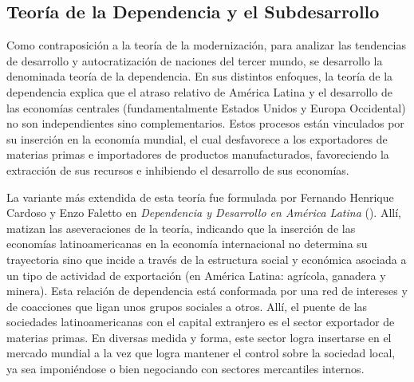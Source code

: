 \documentclass{article}
\begin{document}
\subsection{Teoría de la Dependencia y el Subdesarrollo}

Como contraposición a la teoría de la modernización, para analizar las tendencias de
desarrollo y autocratización de naciones del tercer mundo, se desarrollo la denominada
teoría de la dependencia. En sus distintos enfoques, la teoría de la dependencia explica
que el atraso relativo de América Latina y el desarrollo de las economías centrales
(fundamentalmente Estados Unidos y Europa Occidental) no son independientes sino 
complementarios. Estos procesos están vinculados por su inserción en la economía mundial,
el cual desfavorece a los exportadores de materias primas e importadores de productos
manufacturados, favoreciendo la extracción de sus recursos e inhibiendo el desarrollo
de sus economías.

La variante más extendida de esta teoría fue formulada por Fernando Henrique Cardoso
y Enzo Faletto en \textit{Dependencia y Desarrollo en América Latina} 
(\citeyear{cardoso1979dependencia}). Allí, matizan las aseveraciones de la teoría, 
indicando que la inserción de las economías latinoamericanas en la economía internacional
no determina su trayectoria sino que incide a través de la estructura social y económica
asociada a un tipo de actividad de exportación (en América Latina: agrícola, ganadera y
minera). Esta relación de dependencia está conformada por una red de intereses y de 
coacciones que ligan unos grupos sociales a otros. Allí, el puente de las sociedades 
latinoamericanas con el capital extranjero es el sector exportador de materias primas. 
En diversas medida y forma, este sector logra insertarse en el mercado mundial a la vez 
que logra mantener el control sobre la sociedad local, ya sea imponiéndose o bien 
negociando con sectores mercantiles internos.
\end{document}
